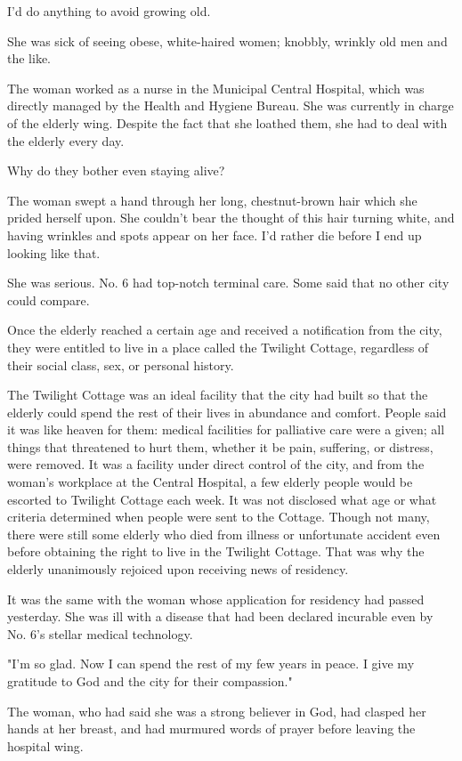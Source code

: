 I'd do anything to avoid growing old.

She was sick of seeing obese, white-haired women; knobbly, wrinkly old
men and the like.~

The woman worked as a nurse in the Municipal Central Hospital, which was
directly managed by the Health and Hygiene Bureau. She was currently in
charge of the elderly wing. Despite the fact that she loathed them, she
had to deal with the elderly every day.

Why do they bother even staying alive?

The woman swept a hand through her long, chestnut-brown hair which she
prided herself upon. She couldn't bear the thought of this hair turning
white, and having wrinkles and spots appear on her face. I'd rather die
before I end up looking like that.

She was serious. No. 6 had top-notch terminal care. Some said that no
other city could compare.

Once the elderly reached a certain age and received a notification from
the city, they were entitled to live in a place called the Twilight
Cottage, regardless of their social class, sex, or personal history.

The Twilight Cottage was an ideal facility that the city had built so
that the elderly could spend the rest of their lives in abundance and
comfort. People said it was like heaven for them: medical facilities for
palliative care were a given; all things that threatened to hurt them,
whether it be pain, suffering, or distress, were removed. It was a
facility under direct control of the city, and from the woman's
workplace at the Central Hospital, a few elderly people would be
escorted to Twilight Cottage each week. It was not disclosed what age or
what criteria determined when people were sent to the Cottage. Though
not many, there were still some elderly who died from illness or
unfortunate accident even before obtaining the right to live in the
Twilight Cottage. That was why the elderly unanimously rejoiced upon
receiving news of residency.

It was the same with the woman whose application for residency had
passed yesterday. She was ill with a disease that had been declared
incurable even by No. 6's stellar medical technology.

"I'm so glad. Now I can spend the rest of my few years in peace. I give
my gratitude to God and the city for their compassion."

The woman, who had said she was a strong believer in God, had clasped
her hands at her breast, and had murmured words of prayer before leaving
the hospital wing.

